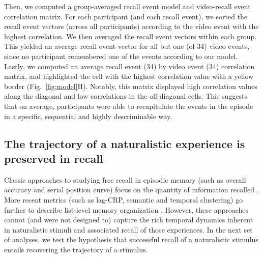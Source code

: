 \documentclass{article}
\begin{document}
Then, we computed a group-averaged recall event model and video-recall event correlation matrix. For each participant (and each recall event), we sorted the recall event vectors (across all participants) according to the video event with the highest correlation. We then averaged the recall event vectors within each group. This yielded an average recall event vector for all but one (of 34) video events, since no participant remembered one of the events according to our model. Lastly, we computed an average recall event (34) by video event (34) correlation matrix, and highlighted the cell with the highest correlation value with a yellow border (Fig.~\ref{fig:model}H). Notably, this matrix displayed high correlation values along the diagonal and low correlations in the off-diagonal cells. This suggests that on average, participants were able to recapitulate the events in the episode in a specific, sequential and highly descriminable way.

\subsection*{The trajectory of a naturalistic experience is preserved in recall}
Classic approaches to studying free recall in episodic memory (such as overall accuracy and serial position curve) focus on the quantity of information recalled \citep{Murd62a}. More recent metrics (such as lag-CRP, semantic and temporal clustering) go further to describe list-level memory organization \citep{Kaha96, PolyEtal09}. However, these approaches cannot (and were not designed to) capture the rich temporal dynamics inherent in naturalistic stimuli and associated recall of those experiences. In the next set of analyses, we test the hypothesis that successful recall of a naturalistic stimulus entails recovering the trajectory of a stimulus.
\end{document}
